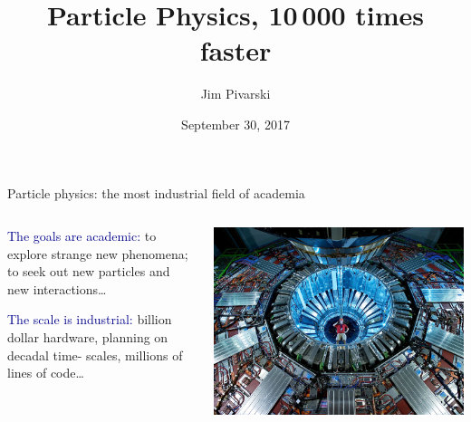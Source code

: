 \documentclass[aspectratio=169]{beamer}
\title[2017-09-29-strangeloop]{Particle Physics, 10\,000 times faster}
\author{Jim Pivarski}
\institute{Princeton University -- DIANA}
\date{September 30, 2017}
\begin{document}

\begin{frame}
  \titlepage
\end{frame}



\begin{frame}{Particle physics: the most industrial field of academia}
\vspace{0.15 cm}
\begin{columns}
\begin{center}
\begin{minipage}{0.8\linewidth}

\textcolor{darkblue}{The goals are academic:} to explore strange new phenomena; to seek out new particles and new \mbox{interactions\ldots}

\vspace{0.5 cm}
\textcolor{darkblue}{The scale is industrial:} \mbox{billion} dollar hardware, planning on decadal time- scales, \mbox{millions} of lines of code\ldots

\vspace{0.5 cm}
\end{minipage}
\end{center}

\includegraphics[width=\linewidth]{lhc-industrial-2.jpg}

\end{columns}
\end{frame}
\end{document}
